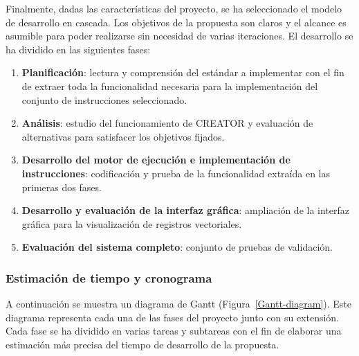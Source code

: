 Finalmente, dadas las características del proyecto, se ha seleccionado el modelo de desarrollo en cascada. Los objetivos de la propuesta son claros y el alcance es asumible para poder realizarse sin necesidad de varias iteraciones. El desarrollo se ha dividido en las siguientes fases:
\begin{enumerate}
    \item \textbf{Planificación}: lectura y comprensión del estándar a implementar con el fin de extraer toda la funcionalidad necesaria para la implementación del conjunto de instrucciones seleccionado.
    \item \textbf{Análisis}: estudio del funcionamiento de CREATOR y evaluación de alternativas para satisfacer los objetivos fijados.
    \item \textbf{Desarrollo del motor de ejecución e implementación de instrucciones}: codificación y prueba de la funcionalidad extraída en las primeras dos fases.
    \item \textbf{Desarrollo y evaluación de la interfaz gráfica}: ampliación de la interfaz gráfica para la visualización de registros vectoriales.
    \item \textbf{Evaluación del sistema completo}: conjunto de pruebas de validación.
\end{enumerate}

\subsubsection{Estimación de tiempo y cronograma}\label{subsec:Gantt-diagram}
A continuación se muestra un diagrama de Gantt (Figura~\ref{Gantt-diagram}). Este diagrama representa cada una de las fases del proyecto junto con su extensión. Cada fase se ha dividido en varias tareas y subtareas con el fin de elaborar una estimación más precisa del tiempo de desarrollo de la propuesta.

